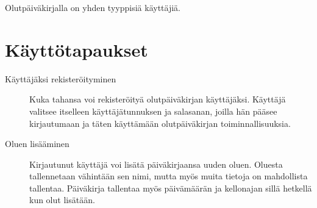 \documentclass[12pt]{amsart}
\begin{document}
Olutpäiväkirjalla on yhden tyyppisiä käyttäjiä.

\section{Käyttötapaukset}

\begin{description}
\item[Käyttäjäksi rekisteröityminen] Kuka tahansa voi rekisteröityä olutpäiväkirjan käyttäjäksi. Käyttäjä valitsee itselleen käyttäjätunnuksen ja salasanan, joilla hän pääsee kirjautumaan ja täten käyttämään olutpäiväkirjan toiminnallisuuksia.

\item[Oluen lisääminen] Kirjautunut käyttäjä voi lisätä päiväkirjaansa uuden oluen. Oluesta tallennetaan vähintään sen nimi, mutta myös muita tietoja on mahdollista tallentaa. Päiväkirja tallentaa myös päivämäärän ja kellonajan sillä hetkellä kun olut lisätään.
\end{description}
\end{document}
